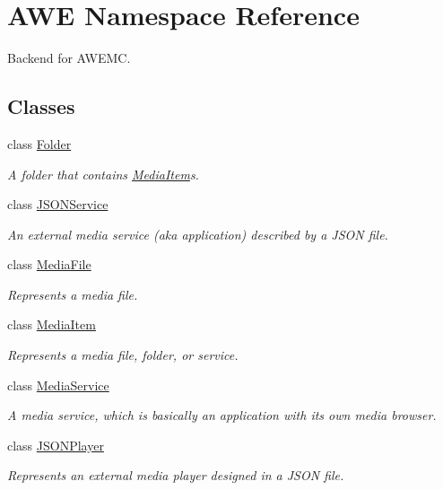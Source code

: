 \hypertarget{namespace_a_w_e}{\section{A\-W\-E Namespace Reference}
\label{namespace_a_w_e}
}


Backend for A\-W\-E\-M\-C.  


\subsection*{Classes}
\begin{DoxyCompactItemize}
\item 
class \hyperlink{class_a_w_e_1_1_folder}{Folder}
\begin{DoxyCompactList}\small\item\em A folder that contains {\ttfamily \hyperlink{class_a_w_e_1_1_media_item}{Media\-Item}}s. \end{DoxyCompactList}\item 
class \hyperlink{class_a_w_e_1_1_j_s_o_n_service}{J\-S\-O\-N\-Service}
\begin{DoxyCompactList}\small\item\em An external media service (aka application) described by a J\-S\-O\-N file. \end{DoxyCompactList}\item 
class \hyperlink{class_a_w_e_1_1_media_file}{Media\-File}
\begin{DoxyCompactList}\small\item\em Represents a media file. \end{DoxyCompactList}\item 
class \hyperlink{class_a_w_e_1_1_media_item}{Media\-Item}
\begin{DoxyCompactList}\small\item\em Represents a media file, folder, or service. \end{DoxyCompactList}\item 
class \hyperlink{class_a_w_e_1_1_media_service}{Media\-Service}
\begin{DoxyCompactList}\small\item\em A media service, which is basically an application with its own media browser. \end{DoxyCompactList}\item 
class \hyperlink{class_a_w_e_1_1_j_s_o_n_player}{J\-S\-O\-N\-Player}
\begin{DoxyCompactList}\small\item\em Represents an external media player designed in a J\-S\-O\-N file. \end{DoxyCompactList}\item 

\end{DoxyCompactItemize}
